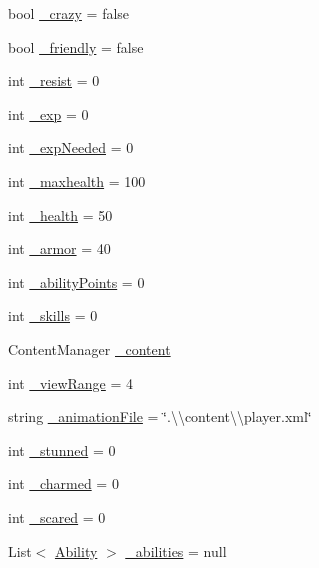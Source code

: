 \begin{DoxyCompactItemize}
\item 
bool \hyperlink{class_gruppe22_1_1_backend_1_1_actor_abfb9be7927de3f5c3c221eef43404005}{\-\_\-crazy} = false
\item 
bool \hyperlink{class_gruppe22_1_1_backend_1_1_actor_ae9ad82d44eefcad479c8dff093ef3c8b}{\-\_\-friendly} = false
\item 
int \hyperlink{class_gruppe22_1_1_backend_1_1_actor_a8f5daef5dca70eb646ee7d6c20efec57}{\-\_\-resist} = 0
\item 
int \hyperlink{class_gruppe22_1_1_backend_1_1_actor_aa16348ec720da67371dbe08b3e7c0e3b}{\-\_\-exp} = 0
\item 
int \hyperlink{class_gruppe22_1_1_backend_1_1_actor_a92de167ad37109b84bf56d0d1bea17d5}{\-\_\-exp\-Needed} = 0
\item 
int \hyperlink{class_gruppe22_1_1_backend_1_1_actor_a661db1997d023af860bfe43043a057b9}{\-\_\-maxhealth} = 100
\item 
int \hyperlink{class_gruppe22_1_1_backend_1_1_actor_abd832633228ad53ca314bf41888f453c}{\-\_\-health} = 50
\item 
int \hyperlink{class_gruppe22_1_1_backend_1_1_actor_aaabaf99935dcfcf861ae81380629300f}{\-\_\-armor} = 40
\item 
int \hyperlink{class_gruppe22_1_1_backend_1_1_actor_ac1939716818aaa3d7dd72d58e3271e15}{\-\_\-ability\-Points} = 0
\item 
int \hyperlink{class_gruppe22_1_1_backend_1_1_actor_afa1bd09529e5040b6a32aae11fa1735f}{\-\_\-skills} = 0
\item 
Content\-Manager \hyperlink{class_gruppe22_1_1_backend_1_1_actor_af412b616dc48c16a2633155c44462852}{\-\_\-content}
\item 
int \hyperlink{class_gruppe22_1_1_backend_1_1_actor_a346e9109439573ab536ab6ee819b4959}{\-\_\-view\-Range} = 4
\item 
string \hyperlink{class_gruppe22_1_1_backend_1_1_actor_a4808e957128607a9828b5c664bce2dc8}{\-\_\-animation\-File} = \char`\"{}.\textbackslash{}\textbackslash{}content\textbackslash{}\textbackslash{}player.\-xml\char`\"{}
\item 
int \hyperlink{class_gruppe22_1_1_backend_1_1_actor_a1e9b1c145b4b5a88a3fe1ba706ffed23}{\-\_\-stunned} = 0
\item 
int \hyperlink{class_gruppe22_1_1_backend_1_1_actor_ae84ade4a1e62477765d6819d029f2355}{\-\_\-charmed} = 0
\item 
int \hyperlink{class_gruppe22_1_1_backend_1_1_actor_a0cb71e4de44e6c9c114b3a43f7d196f8}{\-\_\-scared} = 0
\item 
List$<$ \hyperlink{class_gruppe22_1_1_backend_1_1_ability}{Ability} $>$ \hyperlink{class_gruppe22_1_1_backend_1_1_actor_ab14f7cd68b782e54e1a32295a83ea874}{\-\_\-abilities} = null
\end{DoxyCompactItemize}
